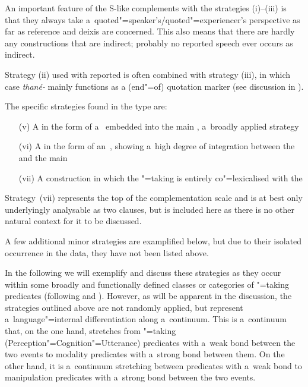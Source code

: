 An important feature of the S-like complements with the strategies (i)--(iii) is that they always take a~quoted"=speaker's/quoted"=experiencer's perspective as far as  reference and deixis are concerned. This also means that there are hardly any constructions that are indirect; probably no reported speech ever occurs as indirect.


Strategy (ii) used with reported  is often combined with strategy (iii), in which case \textit{thané-} mainly functions as a (end"=of) quotation marker (see discussion in ).


The specific strategies found in the  type are:

\begin{enumerate}
\item[(v)] A  in the form of a~ embedded into the main , a~broadly applied strategy
\item[(vi)] A  in the form of an~, showing a~high degree of integration between the  and the main 
\item[(vii)] A  construction in which the "=taking  is entirely co"=lexicalised with the 
\end{enumerate}
Strategy~(vii) represents the top of the complementation scale \citep[74]{givon2001b} and is at best only underlyingly analysable as two clauses, but is included here as there is no other natural context for it to be discussed.


A few additional minor strategies are examplified below, but due to their isolated occurrence in the data, they have not been listed above.



In the following we will exemplify and discuss these strategies as they occur within some broadly and functionally defined classes or categories of "=taking predicates (following \citealt[40--59]{givon2001b} and \citealt[120--145]{noonan2007}). However, as will be apparent in the discussion, the strategies outlined above are not randomly applied, but represent a~language"=internal differentiation along a~continuum. This is a~continuum that, on the one hand, stretches from "=taking  (Perception"=Cognition"=Utterance) predicates with a~weak bond between the two events to modality predicates with a~strong bond between them. On the other hand, it is a~continuum stretching between  predicates with a~weak bond to manipulation predicates with a~strong bond between the two events.


